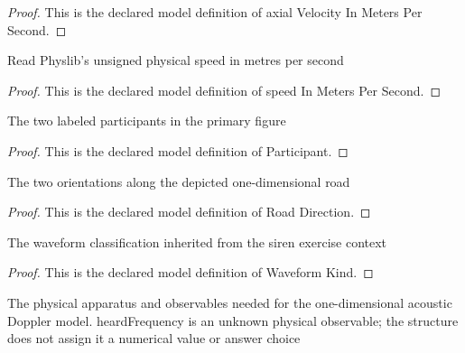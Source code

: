 \begin{proof}
  This is the declared model definition of axial Velocity In Meters Per Second.
\end{proof}
\begin{definition}
  \label{def:physics:phyx-mini-0196:phyxminiproblems-problemphyxmini0196-speedinmeterspersecond}
  Read Physlib's unsigned physical speed in metres per second
\end{definition}
\begin{proof}
  This is the declared model definition of speed In Meters Per Second.
\end{proof}
\begin{definition}[Participant]
  \label{def:physics:phyx-mini-0196:phyxminiproblems-problemphyxmini0196-participant}
  The two labeled participants in the primary figure
\end{definition}
\begin{proof}
  This is the declared model definition of Participant.
\end{proof}
\begin{definition}
  \label{def:physics:phyx-mini-0196:phyxminiproblems-problemphyxmini0196-roaddirection}
  The two orientations along the depicted one-dimensional road
\end{definition}
\begin{proof}
  This is the declared model definition of Road Direction.
\end{proof}
\begin{definition}
  \label{def:physics:phyx-mini-0196:phyxminiproblems-problemphyxmini0196-waveformkind}
  The waveform classification inherited from the siren exercise context
\end{definition}
\begin{proof}
  This is the declared model definition of Waveform Kind.
\end{proof}
\begin{definition}
  \label{def:physics:phyx-mini-0196:phyxminiproblems-problemphyxmini0196-sirenlistenerdopplersetup}
  The physical apparatus and observables needed for the one-dimensional acoustic Doppler model. heardFrequency is an unknown physical observable; the structure does not assign it a numerical value or answer choice
\end{definition}
